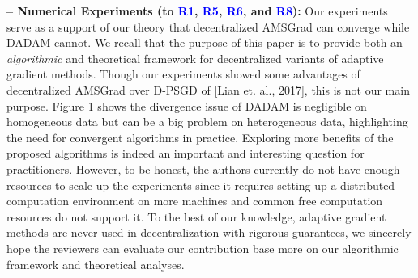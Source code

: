 \documentclass{article} %
\begin{document}
 \textbf{-- Numerical Experiments (to \textcolor{blue}{\textbf{R1}},  \textcolor{blue}{\textbf{R5}},  \textcolor{blue}{\textbf{R6}}, and \textcolor{blue}{\textbf{R8}}):} 
 Our experiments serve as a support of our theory that decentralized AMSGrad can converge while DADAM cannot.
We recall that the purpose of this paper is to provide both an \emph{algorithmic} and {theoretical} framework for decentralized variants of adaptive gradient methods. 
Though our experiments showed some advantages of decentralized AMSGrad over  D-PSGD of [Lian et. al., 2017], this is not our main purpose. %
 Figure 1 shows the divergence issue of DADAM is negligible on homogeneous data but can be a big problem on heterogeneous data, highlighting the need for convergent algorithms in practice. Exploring more benefits of the proposed algorithms is indeed an important and interesting question for practitioners. However, to be honest, the authors currently do not have enough  resources to scale up the experiments since it requires setting up a distributed computation environment on more machines and common free computation resources do not support it. To the best of our knowledge, adaptive gradient methods are never used in decentralization with rigorous guarantees, we sincerely hope the reviewers can evaluate our contribution base more on our algorithmic framework and theoretical analyses.
\end{document}
